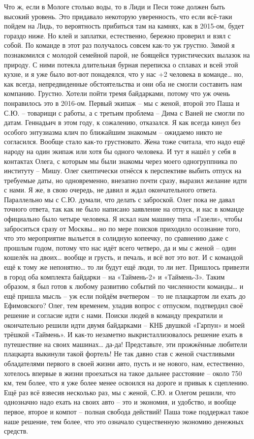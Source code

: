 Что ж, если в Мологе столько воды, то в Лиди и Песи тоже должен быть высокий уровень. Это придавало некоторую уверенность, что если всё-таки пойдем на Лидь, то вероятность прибиться там на камнях, как в 2015-ом, будет гораздо ниже. Но клей и заплатки, естественно, бережно проверил и взял с собой.
По команде в этот раз получалось совсем как-то уж грустно. Зимой я познакомился с молодой семейной парой, не боящейся туристических вылазок на природу. С ними потекла длительная бурная переписка о сплавах и всей этой кухне, и я уже было вот-вот понадеялся, что у нас +2 человека в команде… но, как всегда, непредвиденные обстоятельства и они оба не смогли составить нам компанию. Грустно. 
Хотели пойти тремя байдарками, потому что уж очень понравилось это в 2016-ом. Первый экипаж – мы с женой, второй это Паша и С.Ю. – товарищи с работы, а с третьим проблема – Дима с Ваней не смогли по датам. Геннадьич в этом году, к сожалению, отказался. Я как всегда кинул без особого энтузиазма клич по ближайшим знакомым – ожидаемо никто не согласился. Вообще стало как-то грустновато. Жена тоже считала, что надо ещё народу на один экипаж или хотя бы одного человека. И тут я нашёл у себя в контактах Олега, с которым мы были знакомы через моего одногруппника по институту – Мишу. Олег скептически отнёсся к перспективе выбить отпуск на требуемые даты, но одновременно, внезапно почти сразу, выразил желание идти с нами. Я же, в свою очередь, не давил и ждал окончательного ответа. 
Параллельно мы с С.Ю. думали, что делать с заброской. Олег пока не давал точного ответа, так как не было написано заявление на отпуск, и нас в команде официально было четыре человека. Я искал нам машину типа «Газели», чтобы заброситься сразу от Москвы… но по мере поисков приходило осознание того, что это мероприятие выльется в солидную копеечку, по сравнению даже с прошлым годом, потому что нас идёт всего четверо, да и мы с женой – один кошелёк на двоих… вообще и грусть, и печаль, и всё вот это вот. И с командой ещё к тому же непонятно… то ли будут ещё люди, то ли нет. Пришлось привезти в город оба комплекта байдарки – на «Таймень-2» и «Таймень-3». Таким образом, я был готов к любому развитию событий по численности команды… и ещё пришла мысль – уж если пойдём вчетвером – то не плацкартом ли ехать до Ефимовского?
Олег, тем временем, уладив вопрос с отпуском, подтвердил своё решение и согласие идти с нами. Поиски людей в команду прекратили и окончательно решили идти двумя байдарками – КНБ двушкой «Гарпун» и моей трёшкой «Таймень». И как-то незаметно выкристаллизовалось решение ехать в путешествие на своих машинах… да-да! Представьте, эти прожжённые любители плацкарта выкинули такой фортель! Не так давно став с женой счастливыми обладателями первого в своей жизни авто, пусть и не нового, нам, естественно, хотелось впервые в жизни проехаться на такое дальнее расстояние – около 750 км, тем более, что я уже более менее освоился на дороге и привык к сцеплению. Ещё раз всё взвесив несколько раз, мы с женой, С.Ю. и Олегом решили, что однозначно надо ехать на своих авто – это и экономия, и удобство, и вообще первое, второе и компот – полная свобода действий! Паша тоже поддержал такое наше решение, тем более, что это означало существенную экономию денежных средств. 

